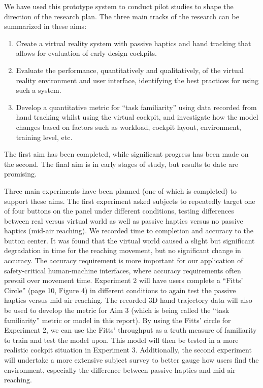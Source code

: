 We have used this prototype system to conduct pilot studies to shape the direction of the research plan. The three main tracks of the research can be summarized in these aims:

\begin{enumerate}
\item Create a virtual reality system with passive haptics and hand tracking that allows for evaluation of early design cockpits.
\item Evaluate the performance, quantitatively and qualitatively, of the virtual reality environment and user interface, identifying the best practices for using such a system.
\item Develop a quantitative metric for ``task familiarity'' using data recorded from hand tracking whilst using the virtual cockpit, and investigate how the model changes based on factors such as workload, cockpit layout, environment, training level, etc.
\end{enumerate}

The first aim has been completed, while significant progress has been made on the second. The final aim is in early stages of study, but results to date are promising.

Three main experiments have been planned (one of which is completed) to support these aims. The first experiment asked subjects to repeatedly target one of four buttons on the panel under different conditions, testing differences between real versus virtual world as well as passive haptics versus no passive haptics (mid-air reaching). We recorded time to completion and accuracy to the button center. It was found that the virtual world caused a slight but significant degradation in time for the reaching movement, but no significant change in accuracy. The accuracy requirement is more important for our application of safety-critical human-machine interfaces, where accuracy requirements often prevail over movement time. Experiment 2 will have users complete a ``Fitts' Circle'' (page 10, Figure 4) in different conditions to again test the passive haptics versus mid-air reaching. The recorded 3D hand trajectory data will also be used to develop the metric for Aim 3 (which is being called the ``task familiarity'' metric or model in this report). By using the Fitts' circle for Experiment 2, we can use the Fitts' throughput as a truth measure of familiarity to train and test the model upon. This model will then be tested in a more realistic cockpit situation in Experiment 3. Additionally, the second experiment will undertake a more extensive subject survey to better gauge how users find the environment, especially the difference between passive haptics and mid-air reaching.


